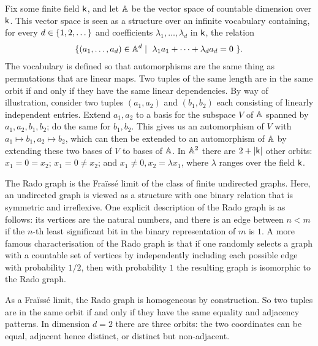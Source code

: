 \begin{example} \label{ex:vector-space-atoms} 
    Fix some finite field $\mathsf{k}$, and let $\mathbb{A}$ be the vector space of countable dimension over $\mathsf{k}$. 
    This vector space is seen as a structure over an infinite vocabulary containing, for every $d \in \{1,2,\dots\}$ and coefficients $\lambda_1, \dots, \lambda_d$ in $\mathsf{k}$, the relation 
    \begin{align*}
        \{(a_1,\dots,a_d) \in \mathbb{A}^d \mid \text{ $\lambda_1 a_1 + \cdots + \lambda_d a_d = 0$ }\}.
    \end{align*}
    The vocabulary is defined so that automorphisms are the same thing as permutations that are linear maps. 
    Two tuples of the same length are in the same orbit if and only if they have the same linear dependencies. 
    By way of illustration, consider two tuples $(a_1, a_2)$ and $(b_1, b_2)$ each consisting of linearly independent entries.
    Extend $a_1, a_2$ to a basis for the subspace $V$ of $\mathbb{A}$ spanned by $a_1, a_2, b_1, b_2$; 
    do the same for $b_1, b_2$.
    This gives us an automorphism of $V$ with $a_1 \mapsto b_1, a_2 \mapsto b_2$, which can then be extended to an automorphism of $\mathbb{A}$ by extending these two bases of $V$ to bases of $\mathbb{A}$.
    In $\mathbb{A}^2$ there are $2 + |\mathsf{k}|$ other orbits:
    $x_1 = 0 = x_2$;
    $x_1 = 0 \neq x_2$;
    and $x_1 \neq 0, x_2 = \lambda x_1$, where $\lambda$ ranges over the field $\mathsf{k}$.
\lipicsEnd\end{example}

\begin{example}\label{ex:rado-graph} 
    The Rado graph is the Fraïssé limit of the class of finite undirected graphs. 
    Here, an undirected graph is viewed as a structure with one binary relation that is symmetric and irreflexive. 
    One explicit description of the Rado graph is as follows: its vertices are the natural numbers, and there is an edge between $n < m$ if the $n$-th least significant bit in the binary representation of $m$ is $1$.
    A more famous characterisation of the Rado graph is that if one randomly selects a graph with a countable set of vertices by independently including each possible edge with probability $1/2$, then with probability $1$ the resulting graph is isomorphic to the Rado graph. 
    
    As a Fraïssé limit, the Rado graph is homogeneous by construction.
    So two tuples are in the same orbit if and only if they have the same equality and adjacency patterns.
    In dimension $d = 2$ there are three orbits:
    the two coordinates can be equal, adjacent hence distinct, or distinct but non-adjacent.
\lipicsEnd\end{example}
